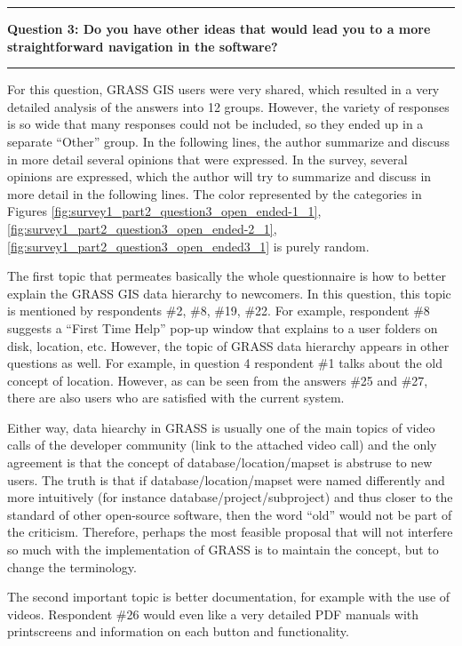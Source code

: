 \documentclass[a4paper,10pt,twoside]{article}
\begin{document}
\par\noindent\rule{\textwidth}{0.4pt}
\noindent \textbf{Question 3: Do you have other ideas that would lead you to a more straightforward navigation in the software?}
\par\noindent\rule{\textwidth}{0.4pt}
\noindent For this question, GRASS GIS users were very shared, which resulted in a very detailed analysis of the answers into 12 groups. However, the variety of responses is so wide that many responses could not be included, so they ended up in a separate ``Other'' group. In the following lines, the author summarize and discuss in more detail several opinions that were expressed. In the survey, several opinions are expressed, which the author will try to summarize and discuss in more detail in the following lines. The color represented by the categories in Figures \ref{fig:survey1_part2_question3_open_ended-1_1}, \ref{fig:survey1_part2_question3_open_ended-2_1}, \ref{fig:survey1_part2_question3_open_ended3_1} is purely random.

The first topic that permeates basically the whole questionnaire is how to better explain the GRASS GIS data hierarchy to newcomers. In this question, this topic is mentioned by respondents \#2, \#8, \#19, \#22. For example, respondent \#8 suggests a ``First Time Help'' pop-up window that explains to a user folders on disk, location, etc. However, the topic of GRASS data hierarchy appears in other questions as well. For example, in question 4 respondent \#1 talks about the old concept of location. However, as can be seen from the answers \#25 and \#27, there are also users who are satisfied with the current system.

Either way, data hiearchy in GRASS is usually one of the main topics of video calls of the developer community (link to the attached video call) and the only agreement is that the concept of database/location/mapset is abstruse to new users. The truth is that if database/location/mapset were named differently and more intuitively (for instance database/project/subproject) and thus closer to the standard of other open-source software, then the word ``old'' would not be part of the criticism. Therefore, perhaps the most feasible proposal that will not interfere so much with the implementation of GRASS is to maintain the concept, but to change the terminology.

The second important topic is better documentation, for example with the use of videos. Respondent \#26 would even like a very detailed PDF manuals with printscreens and information on each button and functionality.
\end{document}
